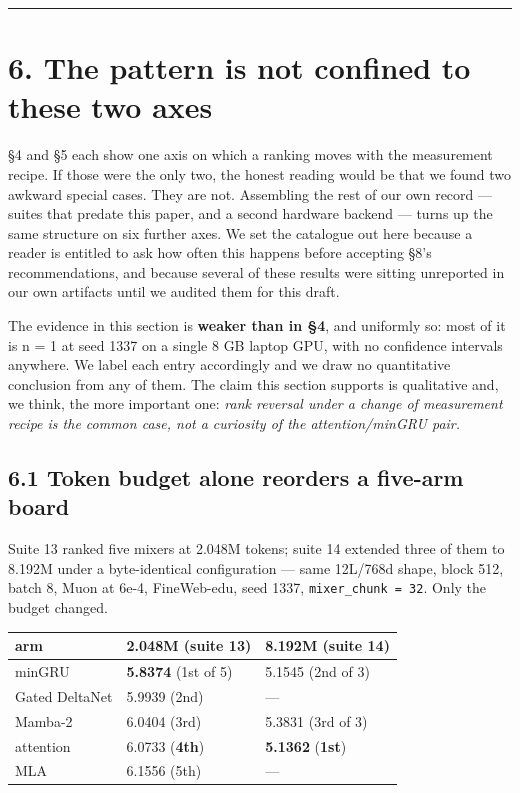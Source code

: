 \begin{center}\rule{0.5\linewidth}{0.5pt}\end{center}

\section{6. The pattern is not confined to these two axes}\label{the-pattern-is-not-confined-to-these-two-axes}

\S4 and \S5 each show one axis on which a ranking moves with the measurement recipe. If those were
the only two, the honest reading would be that we found two awkward special cases. They are not.
Assembling the rest of our own record --- suites that predate this paper, and a second hardware
backend --- turns up the same structure on six further axes. We set the catalogue out here because a
reader is entitled to ask how often this happens before accepting \S8's recommendations, and
because several of these results were sitting unreported in our own artifacts until we audited
them for this draft.

The evidence in this section is \textbf{weaker than in \S4}, and uniformly so: most of it is n = 1 at
seed 1337 on a single 8 GB laptop GPU, with no confidence intervals anywhere. We label each entry
accordingly and we draw no quantitative conclusion from any of them. The claim this section
supports is qualitative and, we think, the more important one: \emph{rank reversal under a change of
measurement recipe is the common case, not a curiosity of the attention/minGRU pair.}

\subsection{6.1 Token budget alone reorders a five-arm board}\label{token-budget-alone-reorders-a-five-arm-board}

Suite 13 ranked five mixers at 2.048M tokens; suite 14 extended three of them to 8.192M under a
byte-identical configuration --- same 12L/768d shape, block 512, batch 8, Muon at 6e-4, FineWeb-edu,
seed 1337, \texttt{mixer\_chunk\ =\ 32}. Only the budget changed.

{%
{\small\begin{longtable}[]{@{}lll@{}}
\toprule\noalign{}
arm & 2.048M (suite 13) & 8.192M (suite 14) \\
\midrule\noalign{}
\endhead
\bottomrule\noalign{}
\endlastfoot
minGRU & \textbf{5.8374} (1st of 5) & 5.1545 (2nd of 3) \\
Gated DeltaNet & 5.9939 (2nd) & --- \\
Mamba-2 & 6.0404 (3rd) & 5.3831 (3rd of 3) \\
attention & 6.0733 (\textbf{4th}) & \textbf{5.1362} (\textbf{1st}) \\
MLA & 6.1556 (5th) & --- \\
\end{longtable}}
}

